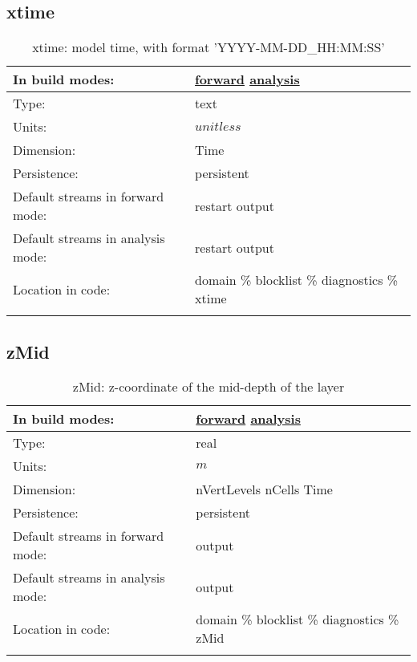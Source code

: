 \subsection[xtime]{xtime}
\label{subsec:var_sec_diagnostics_xtime}
\begin{center}
\begin{longtable}{| p{2.0in} | p{4.0in} |}
        \hline 
        In build modes: & \hyperref[subsec:forward_var_tab_diagnostics]{forward} \hyperref[subsec:analysis_var_tab_diagnostics]{analysis} \\
        \hline 
        Type: & text \\
        \hline 
        Units: & $unitless$ \\
        \hline 
        Dimension: & Time \\
        \hline 
        Persistence: & persistent \\
        \hline 
		 Default streams in forward mode: &  restart output \\
        \hline 
		 Default streams in analysis mode: &  restart output \\
        \hline 
		 Location in code: & domain \% blocklist \% diagnostics \% xtime \\
		 \hline 
    \caption{xtime: model time, with format 'YYYY-MM-DD\_HH:MM:SS'}
\end{longtable}
\end{center}
\subsection[zMid]{zMid}
\label{subsec:var_sec_diagnostics_zMid}
\begin{center}
\begin{longtable}{| p{2.0in} | p{4.0in} |}
        \hline 
        In build modes: & \hyperref[subsec:forward_var_tab_diagnostics]{forward} \hyperref[subsec:analysis_var_tab_diagnostics]{analysis} \\
        \hline 
        Type: & real \\
        \hline 
        Units: & $m$ \\
        \hline 
        Dimension: & nVertLevels nCells Time \\
        \hline 
        Persistence: & persistent \\
        \hline 
		 Default streams in forward mode: &  output \\
        \hline 
		 Default streams in analysis mode: &  output \\
        \hline 
		 Location in code: & domain \% blocklist \% diagnostics \% zMid \\
		 \hline 
    \caption{zMid: z-coordinate of the mid-depth of the layer}
\end{longtable}
\end{center}

